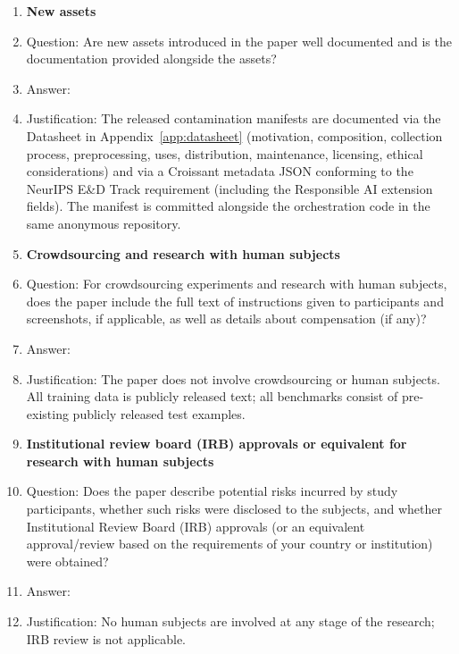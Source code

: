 \begin{enumerate}
\item {\bf New assets}
    \item[] Question: Are new assets introduced in the paper well documented and is the documentation provided alongside the assets?
    \item[] Answer: \answerYes{}
    \item[] Justification: The released contamination manifests are documented via the Datasheet in Appendix~\ref{app:datasheet} (motivation, composition, collection process, preprocessing, uses, distribution, maintenance, licensing, ethical considerations) and via a Croissant metadata JSON conforming to the NeurIPS E\&D Track requirement (including the Responsible AI extension fields). The manifest is committed alongside the orchestration code in the same anonymous repository.

\item {\bf Crowdsourcing and research with human subjects}
    \item[] Question: For crowdsourcing experiments and research with human subjects, does the paper include the full text of instructions given to participants and screenshots, if applicable, as well as details about compensation (if any)?
    \item[] Answer: \answerNA{}
    \item[] Justification: The paper does not involve crowdsourcing or human subjects. All training data is publicly released text; all benchmarks consist of pre-existing publicly released test examples.

\item {\bf Institutional review board (IRB) approvals or equivalent for research with human subjects}
    \item[] Question: Does the paper describe potential risks incurred by study participants, whether such risks were disclosed to the subjects, and whether Institutional Review Board (IRB) approvals (or an equivalent approval/review based on the requirements of your country or institution) were obtained?
    \item[] Answer: \answerNA{}
    \item[] Justification: No human subjects are involved at any stage of the research; IRB review is not applicable.


\end{enumerate}
